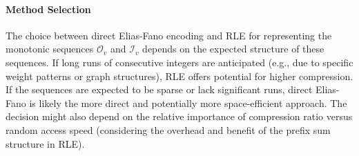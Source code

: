 
\paragraph{Method Selection}
The choice between direct Elias-Fano encoding and RLE for representing the monotonic sequences $\mathcal{O}_v$ and $\mathcal{I}_v$ depends on the expected structure of these sequences. If long runs of consecutive integers are anticipated (e.g., due to specific weight patterns or graph structures), RLE offers potential for higher compression. If the sequences are expected to be sparse or lack significant runs, direct Elias-Fano is likely the more direct and potentially more space-efficient approach. The decision might also depend on the relative importance of compression ratio versus random access speed (considering the overhead and benefit of the prefix sum structure in RLE).

